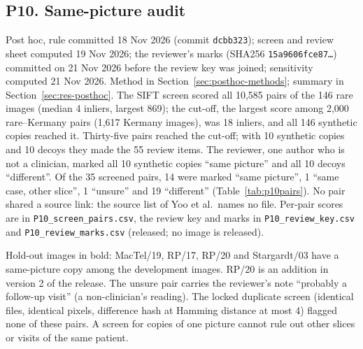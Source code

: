 \subsection*{P10. Same-picture audit}
Post hoc, rule committed 18 Nov 2026 (commit \texttt{dcbb323}); screen and review sheet computed 19 Nov 2026; the reviewer's marks (SHA256 \texttt{15a9606fce87\ldots}) committed on 21 Nov 2026 before the review key was joined; sensitivity computed 21 Nov 2026. Method in Section~\ref{sec:posthoc-methods}; summary in Section~\ref{sec:res-posthoc}. The SIFT screen scored all 10,585 pairs of the 146 rare images (median 4 inliers, largest 869); the cut-off, the largest score among 2,000 rare--Kermany pairs (1,617 Kermany images), was 18 inliers, and all 146 synthetic copies reached it. Thirty-five pairs reached the cut-off; with 10 synthetic copies and 10 decoys they made the 55 review items. The reviewer, one author who is not a clinician, marked all 10 synthetic copies ``same picture'' and all 10 decoys ``different''. Of the 35 screened pairs, 14 were marked ``same picture'', 1 ``same case, other slice'', 1 ``unsure'' and 19 ``different'' (Table~\ref{tab:p10pairs}). No pair shared a source link: the source list of Yoo et al.\ names no file. Per-pair scores are in \texttt{P10\_screen\_pairs.csv}, the review key and marks in \texttt{P10\_review\_key.csv} and \texttt{P10\_review\_marks.csv} (released; no image is released).

\begin{table}[!htbp]
\caption{Post hoc (P10; rule committed 18 Nov 2026, marks committed 21 Nov 2026). Image pairs marked as a match in the blind review, with the set of each image and the keypoint score (RANSAC inliers; cut-off 18). Images are named by their released folder and file.}
\label{tab:p10pairs}
\centering\footnotesize

\par\smallskip
\parbox{0.75\textwidth}{\footnotesize Hold-out images in bold: MacTel/19, RP/17, RP/20 and Stargardt/03 have a same-picture copy among the development images. RP/20 is an addition in version 2 of the release. The unsure pair carries the reviewer's note ``probably a follow-up visit'' (a non-clinician's reading). The locked duplicate screen (identical files, identical pixels, difference hash at Hamming distance at most 4) flagged none of these pairs. A screen for copies of one picture cannot rule out other slices or visits of the same patient.}
\end{table}

